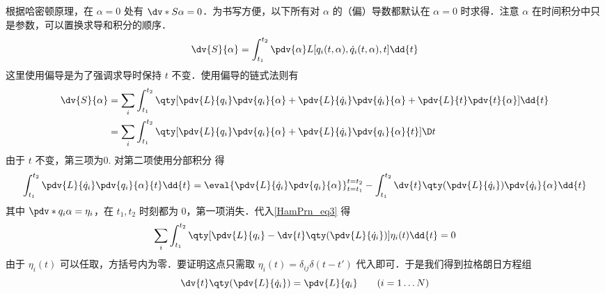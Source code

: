 根据哈密顿原理，在 $\alpha = 0$ 处有 $\dv*{S}{\alpha} = 0$．为书写方便，以下所有对 $\alpha$ 的（偏）导数都默认在 $\alpha=0$ 时求得．注意 $\alpha$ 在时间积分中只是参数，可以置换求导和积分的顺序．
\begin{equation}
\dv{S}{\alpha} = \int_{t_1}^{t_2} \pdv{\alpha} L[q_i(t,\alpha ), \dot q_i(t,\alpha), t] \dd{t}
\end{equation}
这里使用偏导是为了强调求导时保持 $t$ 不变．使用偏导的链式法则有
\begin{equation}\label{HamPrn_eq3}
\begin{aligned}
\dv{S}{\alpha} &= \sum_i \int_{t_1}^{t_2} \qty[\pdv{L}{q_i} \pdv{q_i}{\alpha} + \pdv{L}{\dot q_i} \pdv{\dot q_i}{\alpha} + \pdv{L}{t} \pdv{t}{\alpha}] \dd{t}\\
&= \sum_i \int_{t_1}^{t_2} \qty[\pdv{L}{q_i} \pdv{q_i}{\alpha} + \pdv{L}{\dot q_i}\pdv{q_i}{\alpha}{t}]\D t
\end{aligned}\end{equation}
由于 $t$ 不变，第三项为0. 对第二项使用分部积分 得
\begin{equation}
\int_{t_1}^{t_2} \pdv{L}{\dot q_i} \pdv{q_i}{\alpha}{t} \dd{t}  = \eval{\pdv{L}{\dot q_i}\pdv{q_i}{\alpha}}_{t = t_1}^{t = t_2} - \int_{t_1}^{t_2} \dv{t} \qty(\pdv{L}{\dot q_i})\pdv{\dot q_i}{\alpha} \dd{t}
\end{equation}
其中 $\pdv*{q_i}{\alpha}  = \eta_i$，在 $t_1, t_2$ 时刻都为 0，第一项消失．代入\autoref{HamPrn_eq3} 得
\begin{equation}
\sum_i \int_{t_1}^{t_2} \qty[\pdv{L}{q_i} - \dv{t} \qty(\pdv{L}{\dot q_i})] \eta_i(t) \dd{t} = 0
\end{equation}
由于 $\eta_i(t)$ 可以任取，方括号内为零．要证明这点只需取 $\eta_i(t) = \delta_{ij}\delta(t - t')$ 代入即可．于是我们得到拉格朗日方程组
\begin{equation}
\dv{t} \qty(\pdv{L}{\dot q_i}) = \pdv{L}{q_i} \qquad
(i = 1\dots N)
\end{equation}